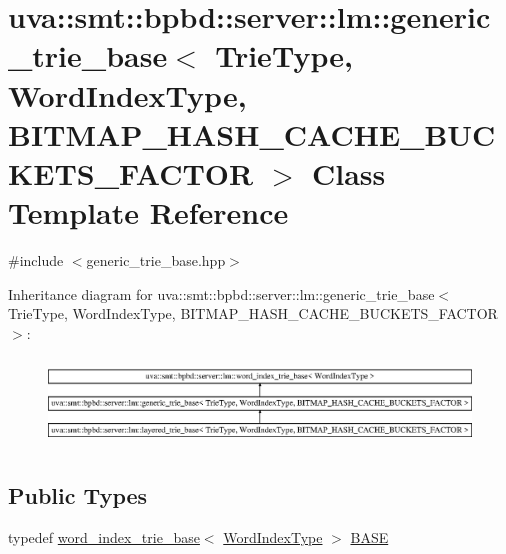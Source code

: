 \hypertarget{classuva_1_1smt_1_1bpbd_1_1server_1_1lm_1_1generic__trie__base}{}\section{uva\+:\+:smt\+:\+:bpbd\+:\+:server\+:\+:lm\+:\+:generic\+\_\+trie\+\_\+base$<$ Trie\+Type, Word\+Index\+Type, B\+I\+T\+M\+A\+P\+\_\+\+H\+A\+S\+H\+\_\+\+C\+A\+C\+H\+E\+\_\+\+B\+U\+C\+K\+E\+T\+S\+\_\+\+F\+A\+C\+T\+O\+R $>$ Class Template Reference}
\label{classuva_1_1smt_1_1bpbd_1_1server_1_1lm_1_1generic__trie__base}


{\ttfamily \#include $<$generic\+\_\+trie\+\_\+base.\+hpp$>$}

Inheritance diagram for uva\+:\+:smt\+:\+:bpbd\+:\+:server\+:\+:lm\+:\+:generic\+\_\+trie\+\_\+base$<$ Trie\+Type, Word\+Index\+Type, B\+I\+T\+M\+A\+P\+\_\+\+H\+A\+S\+H\+\_\+\+C\+A\+C\+H\+E\+\_\+\+B\+U\+C\+K\+E\+T\+S\+\_\+\+F\+A\+C\+T\+O\+R $>$\+:\begin{figure}[H]
\begin{center}
\leavevmode
\includegraphics[height=2.372881cm]{classuva_1_1smt_1_1bpbd_1_1server_1_1lm_1_1generic__trie__base}
\end{center}
\end{figure}
\subsection*{Public Types}
\begin{DoxyCompactItemize}
\item 
typedef \hyperlink{classuva_1_1smt_1_1bpbd_1_1server_1_1lm_1_1word__index__trie__base}{word\+\_\+index\+\_\+trie\+\_\+base}$<$ \hyperlink{classuva_1_1smt_1_1bpbd_1_1server_1_1lm_1_1word__index__trie__base_a64279b5b94c421b25aedaa72e73d013c}{Word\+Index\+Type} $>$ \hyperlink{classuva_1_1smt_1_1bpbd_1_1server_1_1lm_1_1generic__trie__base_ace5120d75920dacafb1564eca63b6885}{B\+A\+S\+E}
\end{DoxyCompactItemize}

